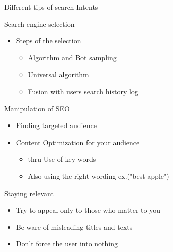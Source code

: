 \documentclass[aspectratio=169]{beamer}
\begin{document}
{{\begin{frame} {\huge Different tips of search Intents}
\begin{itemize}
\end{itemize}
\end{frame}


\begin{frame} {\huge Search engine selection}
\begin{itemize}
    \item<1-> Steps of the selection 
    \begin{itemize}
        \item<2-> Algorithm and Bot sampling
        \item<3-> Universal algorithm 
        \item<4-> Fusion with users search history log 
        \end{itemize}
        \end{itemize}
    
\end{frame}

\begin{frame} {\huge Manipulation of SEO}
\begin{itemize}
    \item<1->Finding targeted audience
    \item<2-> Content Optimization for your audience 
        \begin{itemize}
            \item<3-> thru Use of key words
            \item<4-> Also using the right wording ex.("best apple")
        \end{itemize}
\end{itemize}

\end{frame} 
\begin{frame} {\huge  Staying relevant}
\begin{itemize}
    \item<1-> Try to appeal only to those who matter to you
    \item<2-> Be ware of misleading titles and texts 
    \item<3-> Don't force the user into nothing 
    \end{itemize}

\end{frame}

}}
\end{document}
